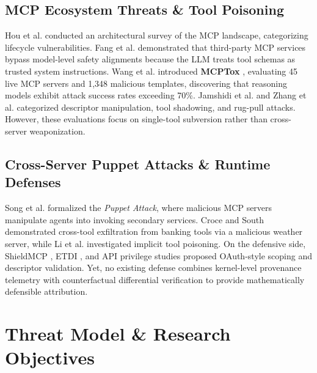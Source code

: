 \documentclass[conference]{IEEEtran}
\begin{document}
\subsection{MCP Ecosystem Threats \& Tool Poisoning}
Hou et al. \cite{hou2026mcp} conducted an architectural survey of the MCP landscape, categorizing lifecycle vulnerabilities. Fang et al. \cite{fang2025thirdparty} demonstrated that third-party MCP services bypass model-level safety alignments because the LLM treats tool schemas as trusted system instructions. Wang et al. introduced \textbf{MCPTox} \cite{wang2026mcptox}, evaluating 45 live MCP servers and 1,348 malicious templates, discovering that reasoning models exhibit attack success rates exceeding 70\%. Jamshidi et al. \cite{jamshidi2025securing} and Zhang et al. \cite{zhang2025msb} categorized descriptor manipulation, tool shadowing, and rug-pull attacks. However, these evaluations focus on single-tool subversion rather than cross-server weaponization.

\subsection{Cross-Server Puppet Attacks \& Runtime Defenses}
Song et al. \cite{song2026beyond} formalized the \textit{Puppet Attack}, where malicious MCP servers manipulate agents into invoking secondary services. Croce and South \cite{croce2025trivial} demonstrated cross-tool exfiltration from banking tools via a malicious weather server, while Li et al. \cite{li2026mcpitp} investigated implicit tool poisoning. On the defensive side, ShieldMCP \cite{yergattikar2026securing}, ETDI \cite{bhatt2025etdi}, and API privilege studies \cite{li2025privilege} proposed OAuth-style scoping and descriptor validation. Yet, no existing defense combines kernel-level provenance telemetry with counterfactual differential verification to provide mathematically defensible attribution.

\section{Threat Model \& Research Objectives}
\end{document}
